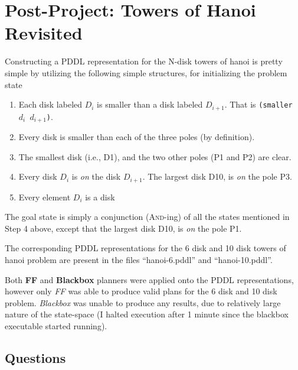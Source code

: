 \documentclass[10pt, letter]{article}
\begin{document}

\section{Post-Project: Towers of Hanoi Revisited}
Constructing a PDDL representation for the N-disk towers of hanoi is pretty simple by utilizing the following simple structures, for initializing the problem state
\begin{enumerate}
\item Each disk labeled $D_i$ is smaller than a disk labeled $D_{i+1}$. That is \texttt{(smaller $d_i$ $d_{i+1}$)}.
\item Every disk is smaller than each of the three poles (by definition).
\item The smallest disk (i.e., D1), and the two other poles (P1 and P2) are clear.
\item Every disk $D_i$ is \emph{on} the disk $D_{i+1}$. The largest disk D10, is \emph{on} the pole P3.
\item Every element $D_i$ is a disk
\end{enumerate}
The goal state is simply a conjunction (\textsc{And}-ing) of all the states mentioned in Step 4 above, except that the largest disk D10, is \emph{on} the pole P1.

The corresponding PDDL representations for the 6 disk and 10 disk towers of hanoi problem are present in the files ``hanoi-6.pddl'' and ``hanoi-10.pddl''.

Both \textbf{FF} and \textbf{Blackbox} planners were applied onto the PDDL representations, however only \textit{FF} was able to produce valid plans for the 6 disk and 10 disk problem. \textit{Blackbox} was unable to produce any results, due to relatively large nature of the state-space (I halted execution after 1 minute since the blackbox executable started running).

\subsection{Questions}
\end{document}
